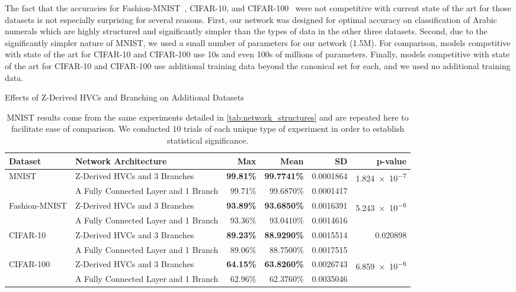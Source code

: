 \documentclass{article}
\begin{document}
The fact that the accuracies for Fashion-MNIST~\cite{Xiao2017}, CIFAR-10, and CIFAR-100~\cite{Krizhevsky2009} were not competitive with current state of the art for those datasets is not especially surprising for several reasons.  First, our network was designed for optimal accuracy on classification of Arabic numerals which are highly structured and significantly simpler than the types of data in the other three datasets.  Second, due to the significantly simpler nature of MNIST, we used a small number of parameters for our network (1.5M).  For comparison, models competitive with state of the art for CIFAR-10 and CIFAR-100 use 10s and even 100s of millions of parameters.  Finally, models competitive with state of the art for CIFAR-10 and CIFAR-100 use additional training data beyond the canonical set for each, and we used no additional training data.

\begin{table}[!ht]
  \caption{Effects of Z-Derived HVCs and Branching on Additional Datasets}
  \centering
    \begin{tabularx}{\textwidth}{@{}lXrrrr@{}}
      \toprule
	      Dataset & Network Architecture & Max & Mean & SD & p-value\\
      \midrule
        \multirow{2}{*}{MNIST}
        & Z-Derived HVCs and 3 Branches & \textbf{99.81\%} & \textbf{99.7741\%} & 0.0001864 &
        \multirow{2}{*}{\num{1.824e-7}} \\
        & A Fully Connected Layer and 1 Branch & 99.71\% & 99.6870\% & 0.0001417 \\
      \midrule
        \multirow{2}{*}{Fashion-MNIST}
        & Z-Derived HVCs and 3 Branches & \textbf{93.89\%} & \textbf{93.6850\%} & 0.0016391 &
        \multirow{2}{*}{\num{5.243e-6}} \\
        & A Fully Connected Layer and 1 Branch & 93.36\% & 93.0410\% & 0.0014616 \\
      \midrule
        \multirow{2}{*}{CIFAR-10}
        & Z-Derived HVCs and 3 Branches & \textbf{89.23\%} & \textbf{88.9290\%} & 0.0015514 &
        \multirow{2}{*}{0.020898} \\
        & A Fully Connected Layer and 1 Branch & 89.06\% & 88.7500\% & 0.0017515 \\
      \midrule
        \multirow{2}{*}{CIFAR-100}
        & Z-Derived HVCs and 3 Branches & \textbf{64.15\%} & \textbf{63.8260\%} & 0.0026743 &
        \multirow{2}{*}{\num{6.859e-6}} \\
        & A Fully Connected Layer and 1 Branch & 62.96\% & 62.3760\% & 0.0035046 \\
      \bottomrule
    \end{tabularx}\\[0.05in]\label{tab:other_datasets}
    \captionsetup{justification=justified,singlelinecheck=false}
    \caption*{MNIST results come from the same experiments detailed in \autoref{tab:network_structures} and are repeated here to facilitate ease of comparison.  We conducted 10 trials of each unique type of experiment in order to establish statistical significance.}
\end{table}
\end{document}
